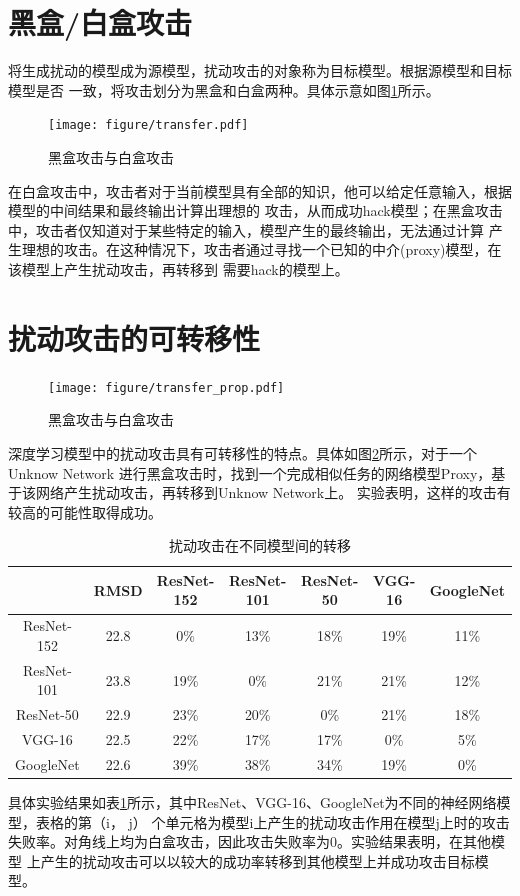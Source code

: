 \section{黑盒/白盒攻击}
将生成扰动的模型成为源模型，扰动攻击的对象称为目标模型。根据源模型和目标模型是否
一致，将攻击划分为黑盒和白盒两种\cite{DBLP:journals/corr/abs-1810-00069}。具体示意如图\ref{fig:black_white}所示。
\begin{figure}[htbp]
    \centering
    \texttt{[image: figure/transfer.pdf]}
    \caption{黑盒攻击与白盒攻击}
    \label{fig:black_white}
\end{figure}

在白盒攻击中，攻击者对于当前模型具有全部的知识，他可以给定任意输入，根据模型的中间结果和最终输出计算出理想的
攻击，从而成功hack模型；在黑盒攻击中，攻击者仅知道对于某些特定的输入，模型产生的最终输出，无法通过计算
产生理想的攻击。在这种情况下，攻击者通过寻找一个已知的中介(proxy)模型，在该模型上产生扰动攻击，再转移到
需要hack的模型上。

\section{扰动攻击的可转移性}
\begin{figure}[htbp]
    \centering
    \texttt{[image: figure/transfer\_prop.pdf]}
    \caption{黑盒攻击与白盒攻击}
    \label{fig:transfer_prop}
\end{figure}
深度学习模型中的扰动攻击具有可转移性的特点。具体如图\ref{fig:transfer_prop}所示，对于一个Unknow Network
进行黑盒攻击时，找到一个完成相似任务的网络模型Proxy，基于该网络产生扰动攻击，再转移到Unknow Network上。
实验表明，这样的攻击有较高的可能性取得成功。

\begin{table}[htbp]
    \centering
    \begin{tabular}{ccccccc}
               & RMSD & ResNet-152 & ResNet-101 & ResNet-50 & VGG-16 & GoogleNet \\ \hline
    ResNet-152 & 22.8 & 0\%        & 13\%       & 18\%      & 19\%   & 11\%      \\
    ResNet-101 & 23.8 & 19\%       & 0\%        & 21\%      & 21\%   & 12\%      \\
    ResNet-50  & 22.9 & 23\%       & 20\%       & 0\%       & 21\%   & 18\%      \\
    VGG-16     & 22.5 & 22\%       & 17\%       & 17\%      & 0\%    & 5\%       \\
    GoogleNet  & 22.6 & 39\%       & 38\%       & 34\%      & 19\%   & 0\%       \\ \hline
    \end{tabular}
    \caption{扰动攻击在不同模型间的转移\cite{DBLP:conf/iclr/LiuCLS17}}
    \label{tab:attack_transfer}
\end{table}

具体实验结果如表\ref{tab:attack_transfer}所示，其中ResNet、VGG-16、GoogleNet为不同的神经网络模型，表格的第（i， j）
个单元格为模型i上产生的扰动攻击作用在模型j上时的攻击失败率。对角线上均为白盒攻击，因此攻击失败率为0。实验结果表明，在其他模型
上产生的扰动攻击可以以较大的成功率转移到其他模型上并成功攻击目标模型。
